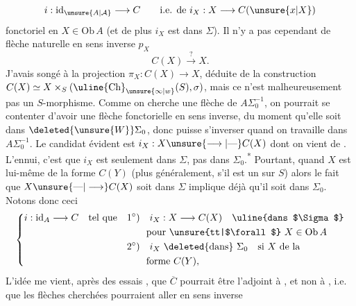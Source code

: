\[
 i:\mathrm{id}_{\unsure{A|\mathcal A}}\longrightarrow C\qquad\text{i.e. de }i_X:X\longrightarrow C(\unsure{x|X})
\]
fonctoriel en $X\in\mathrm{Ob}\,A$ (et de plus $i_X$ est dans $\Sigma$). Il n'y a pas cependant de flèche naturelle en sens inverse $p_X$
\[
 C(X)\xrightarrow{?}X.
\]
J'avais songé à la projection $\pi_X:C(X)\longrightarrow X$, déduite de la construction $C(X)\simeq X\times_S(\text{\uline{Ch}}_{\unsure{\infty|w}}(S),\sigma)$, mais ce n'est malheureusement pas un $S$-morphisme. Comme on cherche une flèche de $A\Sigma_0^{-1}$, on pourrait se contenter d'avoir une flèche fonctorielle en sens inverse, du moment qu'elle soit dans $\deleted{\unsure{W}}\Sigma_0$, donc puisse s'inverser quand on travaille dans $A\Sigma_0^{-1}$. Le candidat évident est $i_X:X\unsure{\longrightarrow|\text{---}}C(X)$ dont on vient de . L'ennui, c'est que $i_X$ est seulement dans $\Sigma$, pas dans $\Sigma_0$.\textsuperscript{*}
Pourtant, quand $X$ est lui-même de la forme $C(Y)$ (plus généralement, s'il est un  sur $S$) alors  le fait que $X\unsure{\text{---}|\longrightarrow}C(X)$ soit dans $\Sigma$ implique déjà qu'il soit dans $\Sigma_0$. Notons donc ceci
\[
 \left\{\begin{aligned}
 i:\mathrm{id}_A\longrightarrow C\quad\text{tel que}\quad&
 1^\circ)\quad i_X:X\longrightarrow C(X)\quad\text{\uline{dans $\Sigma$}}\\
 &\hspace{2em}\text{pour \unsure{tt|$\forall$} }X\in\mathrm{Ob}\,A\\
 &2^\circ)\quad i_X\ \text{\deleted{dans}}\ \Sigma_0\quad\text{si }X\text{ de la}\\
 &\hspace{2em}\text{forme }C(Y),
 \end{aligned}\right.
\]
L'idée me vient, après des essais , que $\overline C$ pourrait être l'adjoint à , et non à , i.e. que les flèches cherchées pourraient aller en sens inverse
